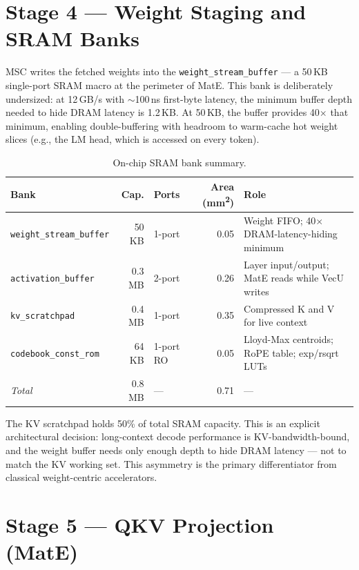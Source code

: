 \documentclass[11pt,letterpaper]{article}
\begin{document}
\section{Stage 4 --- Weight Staging and SRAM Banks}

MSC writes the fetched weights into the \texttt{weight\_stream\_buffer} --- a 50\,KB
single-port SRAM macro at the perimeter of MatE. This bank is deliberately undersized: at
12\,GB/s with $\sim$100\,ns first-byte latency, the minimum buffer depth needed to hide DRAM
latency is 1.2\,KB. At 50\,KB, the buffer provides 40$\times$ that minimum, enabling
double-buffering with headroom to warm-cache hot weight slices (e.g., the LM head, which is
accessed on every token).

\begin{table}[h!]
\centering
\small
\begin{tabular}{@{}l r l r p{6.5cm}@{}}
\toprule
\textbf{Bank} & \textbf{Cap.} & \textbf{Ports} & \textbf{Area (mm\textsuperscript{2})} & \textbf{Role} \\
\midrule
\texttt{weight\_stream\_buffer} & 50 KB & 1-port    & 0.05 & Weight FIFO; 40$\times$ DRAM-latency-hiding minimum \\
\texttt{activation\_buffer}     & 0.3 MB & 2-port   & 0.26 & Layer input/output; MatE reads while VecU writes \\
\texttt{kv\_scratchpad}         & 0.4 MB & 1-port   & 0.35 & Compressed K and V for live context \\
\texttt{codebook\_const\_rom}   & 64 KB & 1-port RO & 0.05 & Lloyd-Max centroids; RoPE table; exp/rsqrt LUTs \\
\midrule
\textit{Total}                  & 0.8 MB & --- & 0.71 & --- \\
\bottomrule
\end{tabular}
\caption{On-chip SRAM bank summary.}
\end{table}

The KV scratchpad holds 50\% of total SRAM capacity. This is an explicit architectural
decision: long-context decode performance is KV-bandwidth-bound, and the weight buffer needs
only enough depth to hide DRAM latency --- not to match the KV working set. This asymmetry is
the primary differentiator from classical weight-centric accelerators.

\section{Stage 5 --- QKV Projection (MatE)}
\end{document}
